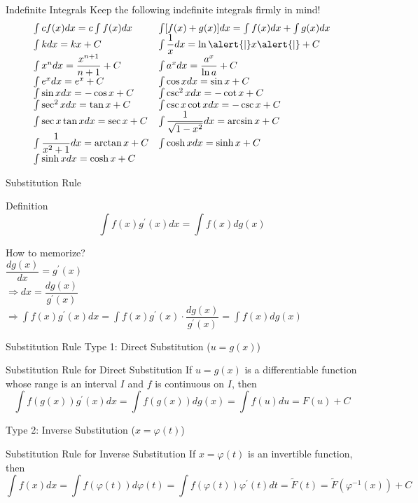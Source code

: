 \begin{frame}{Indefinite Integrals}
    Keep the following indefinite integrals firmly in mind!\\
    $$
        \begin{array}{ll}
            \int c f(x) d x=c \int f(x) d x         & \int[f(x)+g(x)] d x=\int f(x) d x+\int g(x) d x \\
            \int k d x=k x+C                        & \int \dfrac{1}{x} d x=\ln \alert{|}x\alert{|}+C \\
            \int x^{n} d x=\dfrac{x^{n+1}}{n+1}+C   & \int a^{x} d x=\dfrac{a^{x}}{\ln a}+C           \\
            \int e^{x} d x=e^{x}+C                  & \int \cos x d x=\sin x+C                        \\
            \int \sin x d x=-\cos x+C               & \int \csc ^{2} x d x=-\cot x+C                  \\
            \int \sec ^{2} x d x=\tan x+C           & \int \csc x \cot x d x=-\csc x+C                \\
            \int \sec x \tan x d x=\sec x+C         & \int \dfrac{1}{\sqrt{1-x^{2}}} d x=\arcsin x+C  \\
            \int \dfrac{1}{x^{2}+1} d x=\arctan x+C & \int \cosh x d x=\sinh x+C                      \\
            \int \sinh x d x=\cosh x+C
        \end{array}
    $$
\end{frame}

\begin{frame}{Substitution Rule}
    \begin{block}{Definition}
        $$
            \int f(x) g^{\prime}(x) dx= \int f(x)dg(x)
        $$
    \end{block}
    How to memorize?\\
    $\dfrac{dg(x)}{dx}=g^{\prime}(x)$\\$\Rightarrow dx=\dfrac{dg(x)}{g^{\prime}(x)}$\\$\Rightarrow \int f(x) g^{\prime}(x) dx= \int f(x)g^{\prime}(x)\cdot \dfrac{dg(x)}{g^{\prime}(x)}=\int f(x)dg(x)$
\end{frame}

\begin{frame}{Substitution Rule}
    Type 1: Direct Substitution ($u=g(x)$)
    \begin{block}{Substitution Rule for Direct Substitution}
        If $u=g(x)$ is a differentiable function whose range is an interval $I$ and $f$ is continuous on $I$, then
        $$
            \int f(g(x)) g^{\prime}(x) dx= \int f(g(x))dg(x)=\int f(u) d u=F(u)+C
        $$
    \end{block}
    Type 2: Inverse Substitution ($x=\varphi(t)$)
    \begin{block}{Substitution Rule for Inverse Substitution}
        If $x=\varphi(t)$ is an invertible function, then
        $$
            \int f(x)dx = \int f(\varphi (t))d\varphi (t)=\int f(\varphi (t))\varphi ^{\prime}(t)dt=\widetilde{F}(t)=\widetilde{F}(\varphi ^{-1}(x))+C
        $$
    \end{block}
\end{frame}


